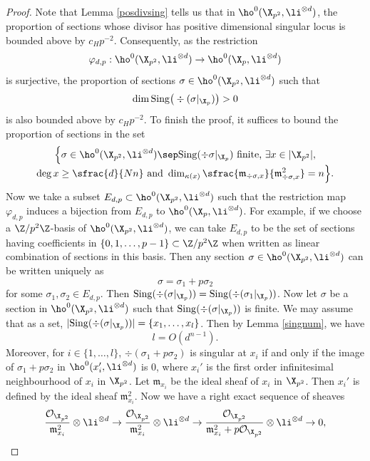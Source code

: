 \begin{proof}
Note that Lemma \ref{posdivsing} tells us that in $\ho^0(\X_{p^2}, \li^{\otimes d})$, the proportion of sections whose divisor has positive dimensional singular locus is bounded above by $c_Hp^{-2}$. Consequently, as the restriction
\[
\varphi_{d,p}: \ho^0(\X_{p^2}, \li^{\otimes d}) \to \ho^0(\X_p, \li^{\otimes d})
\]
is surjective, the proportion of sections $\sigma\in \ho^0(\X_{p^2}, \li^{\otimes d})$ such that
\[
\dim\mathrm{Sing}\big(\div (\sigma|_{\X_p})\big)>0
\]
is also bounded above by $c_Hp^{-2}$. To finish the proof, it suffices to bound the proportion of sections in the set
\begin{multline*}
\Bigl\{ \sigma\in \ho^0(\X_{p^2}, \li^{\otimes d})\sep \mathrm{Sing}(\div \sigma|_{\X_p}) \text{ finite,}\ \exists x\in |\X_{p^2}|,\\[-3pt] \deg x \geq\sfrac{d}{Nn}\text{ and } \dim_{\kappa(x)}\sfrac{\mathfrak{m}_{\div \sigma,x}}{\mathfrak{m}_{\div \sigma,x}^2}=n \Bigr\}.
\end{multline*}
Now we take a subset $E_{d,p}\subset \ho^0(\X_{p^2}, \li^{\otimes d})$ such that the restriction map $\varphi_{d,p}$ induces a bijection from $E_{d,p}$ to $\ho^0(\X_p, \li^{\otimes d})$. For example, if we choose a $\Z/p^2\Z$-basis of $\ho^0(\X_{p^2}, \li^{\otimes d})$, we can take $E_{d,p}$ to be the set of sections having coefficients in $\{0,1,\dots, p-1\}\subset \Z/p^2\Z$ when written as linear combination of sections in this basis. Then any section $\sigma\in\ho^0(\X_{p^2}, \li^{\otimes d})$ can be written uniquely as
\[
\sigma=\sigma_1+p\sigma_2
\]
for some $\sigma_1,\sigma_2\in E_{d,p}$. Then $\mathrm{Sing}(\div (\sigma|_{\X_p})) =\mathrm{Sing}(\div (\sigma_1|_{\X_p})) $. Now let $\sigma$ be a section in $ \ho^0(\X_{p^2}, \li^{\otimes d})$ such that $\mathrm{Sing}(\div (\sigma|_{\X_p}))$ is finite.
\Changel
We may assume that as a set, $|\mathrm{Sing}(\div (\sigma|_{\X_p}))|=\{ x_1,\dots, x_l \}$. Then by Lemma \ref{singnum}, we have
\[
l=O(d^{n-1}).
\]
Moreover, for $i\in\{1,\dots, l \}$, $\div (\sigma_1+p\sigma_2)$ is singular at $x_i$ if and only if the image of $\sigma_1+p\sigma_2$ in $\ho^0(x_i', \li^{\otimes d})$ is $0$, where $x_i'$ is the first order infinitesimal neighbourhood of $x_i$ in $\X_{p^2}$. Let $\mathfrak{m}_{x_i}$ be the ideal sheaf of $x_i$ in $\X_{p^2}$. Then $x_i'$ is defined by the ideal sheaf $\mathfrak{m}_{x_i}^2$. Now we have a right exact sequence of sheaves\Changelback
\[
\frac{\mathcal{O}_{\X_{p^2}}}{\mathfrak{m}_{x_i}^2}\otimes \li^{\otimes d} \to \frac{\mathcal{O}_{\X_{p^2}}}{\mathfrak{m}_{x_i}^2}\otimes \li^{\otimes d} \to \frac{\mathcal{O}_{\X_{p^2}}}{\mathfrak{m}_{x_i}^2+p\mathcal{O}_{\X_{p^2}}}\otimes \li^{\otimes d}\to 0,
\]
\end{proof}
